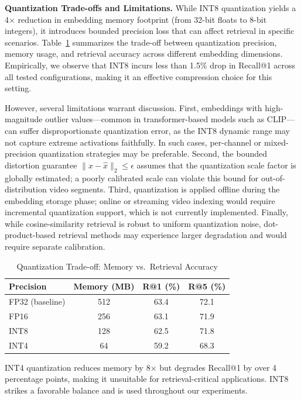 \documentclass[conference,twocolumn]{IEEEtran}
\begin{document}
\textbf{Quantization Trade-offs and Limitations.}
While INT8 quantization yields a 4$\times$ reduction in embedding memory footprint (from 32-bit floats to 8-bit integers), it introduces bounded precision loss that can affect retrieval in specific scenarios. Table~\ref{tab:quantization} summarizes the trade-off between quantization precision, memory usage, and retrieval accuracy across different embedding dimensions. Empirically, we observe that INT8 incurs less than 1.5\% drop in Recall@1 across all tested configurations, making it an effective compression choice for this setting.

However, several limitations warrant discussion. First, embeddings with high-magnitude outlier values---common in transformer-based models such as CLIP---can suffer disproportionate quantization error, as the INT8 dynamic range may not capture extreme activations faithfully. In such cases, per-channel or mixed-precision quantization strategies may be preferable. Second, the bounded distortion guarantee $\|x - \hat{x}\|_2 \le \epsilon$ assumes that the quantization scale factor is globally estimated; a poorly calibrated scale can violate this bound for out-of-distribution video segments. Third, quantization is applied offline during the embedding storage phase; online or streaming video indexing would require incremental quantization support, which is not currently implemented. Finally, while cosine-similarity retrieval is robust to uniform quantization noise, dot-product-based retrieval methods may experience larger degradation and would require separate calibration.

\begin{table}[htbp]
\centering
\caption{Quantization Trade-off: Memory vs.\ Retrieval Accuracy}
\label{tab:quantization}
\begin{tabular}{lccc}
\toprule
\textbf{Precision} & \textbf{Memory (MB)} & \textbf{R@1 (\%)} & \textbf{R@5 (\%)} \\
\midrule
FP32 (baseline) & 512 & 63.4 & 72.1 \\
FP16            & 256 & 63.1 & 71.9 \\
INT8            & 128 & 62.5 & 71.8 \\
INT4            &  64 & 59.2 & 68.3 \\
\bottomrule
\end{tabular}
\end{table}

INT4 quantization reduces memory by 8$\times$ but degrades Recall@1 by over 4 percentage points, making it unsuitable for retrieval-critical applications. INT8 strikes a favorable balance and is used throughout our experiments.
\end{document}
